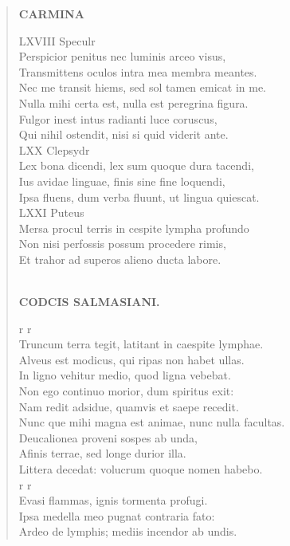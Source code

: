 \documentclass[11pt, a4paper]{report}
\begin{document}
\begin{verse}
    \begin{center} \textbf{CARMINA} \end{center} \marginpar{[238]} LXVIII Speculr \\ Perspicior penitus nec luminis arceo visus, \\ Transmittens oculos intra mea membra meantes. \\ Nec me transit hiems, sed sol tamen emicat in me. \\ Nulla mihi certa est, nulla est peregrina figura. \\ Fulgor inest intus radianti luce coruscus, \\ Qui nihil ostendit, nisi  \lbrack si \rbrack  quid viderit ante. \\ LXX Clepsydr \\ Lex bona dicendi, lex sum quoque dura tacendi, \\ Ius avidae linguae, finis sine fine loquendi, \\ Ipsa fluens, dum verba fluunt, ut lingua quiescat. \\ LXXI Puteus \\ Mersa procul terris in cespite lympha profundo \\ Non nisi perfossis possum procedere rimis, \\ Et trahor ad superos alieno ducta labore. \\ 
        ﻿\pagebreak 
    \begin{center} \textbf{CODCIS SALMASIANI.} \end{center} \marginpar{[239]} r r \\ Truncum terra tegit, latitant in caespite lymphae. \\ Alveus est modicus, qui ripas non habet ullas. \\ In ligno vehitur medio, quod ligna vebebat. \\ Non ego continuo morior, dum spiritus exit: \\ Nam redit adsidue, quamvis et saepe recedit. \\ Nunc \lbrack que \rbrack  mihi magna est animae, nunc nulla facultas. \\ Deucalionea proveni sospes ab unda, \\ Afinis terrae, sed longe durior illa. \\ Littera decedat: volucrum quoque nomen habebo. \\ r r \\ Evasi flammas, ignis tormenta profugi. \\ Ipsa medella meo pugnat contraria fato: \\ Ardeo de lymphis; mediis incendor ab undis. \\ 

\end{verse}
\end{document}
